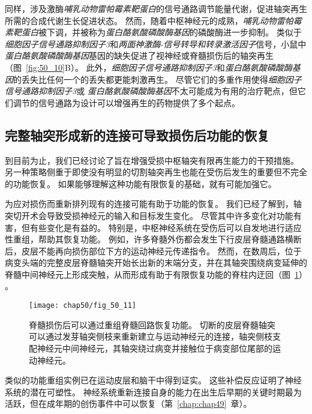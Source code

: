 同样，涉及激酶\textit{哺乳动物雷帕霉素靶蛋白}的信号通路调节能量代谢，促进轴突再生所需的合成代谢生长促进状态。
然而，随着中枢神经元的成熟，\textit{哺乳动物雷帕霉素靶蛋白}被下调，并被称为\textit{蛋白酪氨酸磷酸酶基因}的磷酸酶进一步抑制。
类似于\textit{细胞因子信号通路抑制因子3}和\textit{两面神激酶-信号转导和转录激活因子}信号，小鼠中\textit{蛋白酪氨酸磷酸酶基因}基因的缺失促进了视神经或脊髓损伤后的轴突再生（图~\ref{fig:50_10}B）。
此外，\textit{细胞因子信号通路抑制因子3}和\textit{蛋白酪氨酸磷酸酶基因}的丢失比任何一个的丢失都更能刺激再生。
尽管它们的多重作用使得\textit{细胞因子信号通路抑制因子3}或 \textit{蛋白酪氨酸磷酸酶基因}不太可能成为有用的治疗靶点，但它们调节的信号通路为设计可以增强再生的药物提供了多个起点。



\subsection{完整轴突形成新的连接可导致损伤后功能的恢复}

到目前为止，我们已经讨论了旨在增强受损中枢轴突有限再生能力的干预措施。
另一种策略侧重于即使没有明显的切割轴突再生也能在受伤后发生的重要但不完全的功能恢复。
如果能够理解这种功能有限恢复的基础，就有可能加强它。


为应对损伤而重新排列现有的连接可能有助于功能的恢复。
我们已经了解到，轴突切开术会导致受损神经元的输入和目标发生变化。
尽管其中许多变化对功能有害，但有些变化是有益的。
特别是，中枢神经系统在受伤后可以自发地进行适应性重组，帮助其恢复功能。
例如，许多脊髓外伤都会发生下行皮层脊髓通路横断后，皮层不能再向损伤部位下方的运动神经元传递指令。
然而，在数周后，位于病变头端的完整皮层脊髓轴突开始长出新的末端分支，并在其轴突围绕病变延伸的脊髓中间神经元上形成突触，从而形成有助于有限恢复功能的脊柱内迂回（图~\ref{fig:50_11}） 。



\begin{figure}[htbp]
	\centering
	\texttt{[image: chap50/fig\_50\_11]}
	\caption{脊髓损伤后可以通过重组脊髓回路恢复功能。
		切断的皮层脊髓轴突可以通过发芽轴突侧枝来重新建立与运动神经元的连接，轴突侧枝支配神经元中间神经元，其轴突绕过病变并接触位于病变部位尾部的运动神经元\cite{bareyre2004injured}。}
	\label{fig:50_11}
\end{figure}


类似的功能重组实例已在运动皮层和脑干中得到证实。
这些补偿反应证明了神经系统的潜在可塑性。
神经系统重新连接自身的能力在出生后早期的关键时期最为活跃，但在成年期的创伤事件中可以恢复（第~\ref{chap:chap49}~章）。


